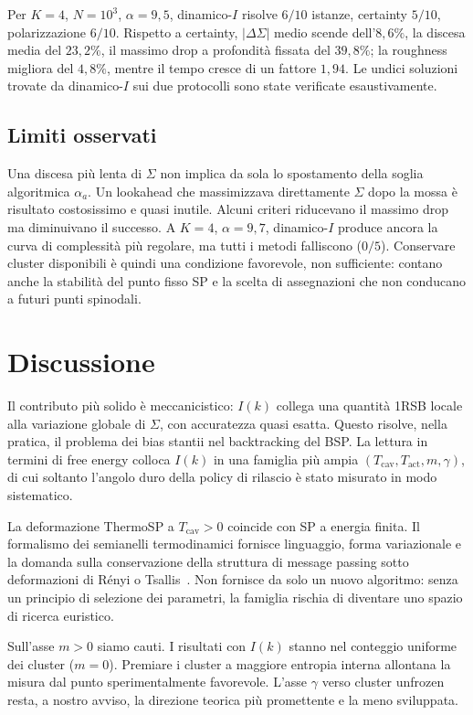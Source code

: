 \documentclass{article}
\newcommand{\Sig}{\Sigma}
\newcommand{\Tc}{T_{\mathrm{cav}}}
\newcommand{\Ta}{T_{\mathrm{act}}}
\begin{document}
Per $K=4$, $N=10^3$, $\alpha=9{,}5$, dinamico-$I$ risolve $6/10$ istanze, certainty $5/10$, polarizzazione $6/10$.
Rispetto a certainty, $|\Delta\Sig|$ medio scende dell'$8{,}6\%$, la discesa media del $23{,}2\%$, il massimo drop a profondit\`a fissata del $39{,}8\%$; la roughness migliora del $4{,}8\%$, mentre il tempo cresce di un fattore $1{,}94$.
Le undici soluzioni trovate da dinamico-$I$ sui due protocolli sono state verificate esaustivamente.

\subsection{Limiti osservati}

Una discesa pi\`u lenta di $\Sig$ non implica da sola lo spostamento della soglia algoritmica $\alpha_a$.
Un lookahead che massimizzava direttamente $\Sig$ dopo la mossa \`e risultato costosissimo e quasi inutile.
Alcuni criteri riducevano il massimo drop ma diminuivano il successo.
A $K=4$, $\alpha=9{,}7$, dinamico-$I$ produce ancora la curva di complessit\`a pi\`u regolare, ma tutti i metodi falliscono ($0/5$).
Conservare cluster disponibili \`e quindi una condizione favorevole, non sufficiente: contano anche la stabilit\`a del punto fisso SP e la scelta di assegnazioni che non conducano a futuri punti spinodali.

\section{Discussione}
\label{sec:discussion}

Il contributo pi\`u solido \`e meccanicistico: $I(k)$ collega una quantit\`a 1RSB locale alla variazione globale di $\Sig$, con accuratezza quasi esatta.
Questo risolve, nella pratica, il problema dei bias stantii nel backtracking del BSP.
La lettura in termini di free energy colloca $I(k)$ in una famiglia pi\`u ampia $(\Tc,\Ta,m,\gamma)$, di cui soltanto l'angolo duro della policy di rilascio \`e stato misurato in modo sistematico.

La deformazione ThermoSP a $\Tc>0$ coincide con SP a energia finita.
Il formalismo dei semianelli termodinamici fornisce linguaggio, forma variazionale e la domanda sulla conservazione della struttura di message passing sotto deformazioni di R\'enyi o Tsallis~\cite{marcolli2017entropy}.
Non fornisce da solo un nuovo algoritmo: senza un principio di selezione dei parametri, la famiglia rischia di diventare uno spazio di ricerca euristico.

Sull'asse $m>0$ siamo cauti.
I risultati con $I(k)$ stanno nel conteggio uniforme dei cluster ($m=0$).
Premiare i cluster a maggiore entropia interna allontana la misura dal punto sperimentalmente favorevole.
L'asse $\gamma$ verso cluster unfrozen resta, a nostro avviso, la direzione teorica pi\`u promettente e la meno sviluppata.
\end{document}
